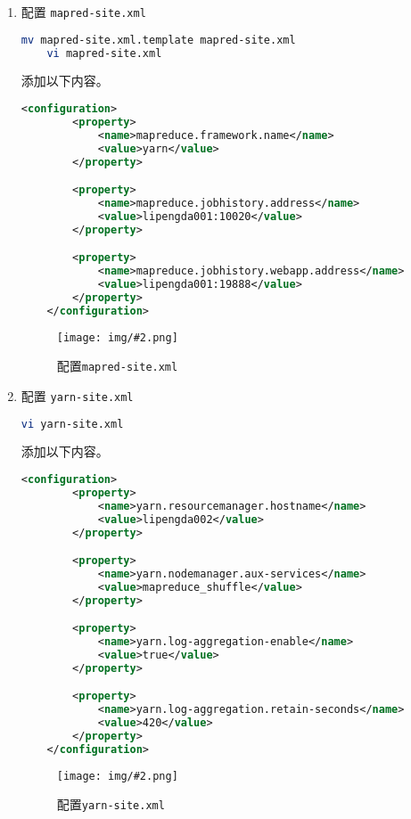 \documentclass{article}
\newenvironment{enum}{
    \begin{enumerate}[label=(\arabic*), noitemsep]
}{
    \end{enumerate}
}
\newcommand{\img}[3][0.9]{%
    \begin{figure}[H]
        \centering
        \texttt{[image: img/\#2.png]}
        \caption{#3}
    \end{figure}
}
\begin{document}
\begin{enum}
    \img{7.1.2.3}{配置\texttt{hdfs-site.xml}}

    \item 配置 \texttt{mapred-site.xml}
    
    \begin{lstlisting}[language=bash]
    mv mapred-site.xml.template mapred-site.xml
    vi mapred-site.xml
    \end{lstlisting}

    添加以下内容。

    \begin{lstlisting}[language=xml]
    <configuration>
        <property>
            <name>mapreduce.framework.name</name>
            <value>yarn</value>
        </property>

        <property>
            <name>mapreduce.jobhistory.address</name>
            <value>lipengda001:10020</value>
        </property>

        <property>
            <name>mapreduce.jobhistory.webapp.address</name>
            <value>lipengda001:19888</value>
        </property>
    </configuration>
    \end{lstlisting}

    \img{7.1.2.4}{配置\texttt{mapred-site.xml}}

    \item 配置 \texttt{yarn-site.xml}
    
    \begin{lstlisting}[language=bash]
    vi yarn-site.xml
    \end{lstlisting}

    添加以下内容。

    \begin{lstlisting}[language=xml]
    <configuration>
        <property>
            <name>yarn.resourcemanager.hostname</name>
            <value>lipengda002</value>
        </property>

        <property>
            <name>yarn.nodemanager.aux-services</name>
            <value>mapreduce_shuffle</value>
        </property>

        <property>
            <name>yarn.log-aggregation-enable</name>
            <value>true</value>
        </property>

        <property>
            <name>yarn.log-aggregation.retain-seconds</name>
            <value>420</value>
        </property>
    </configuration>
    \end{lstlisting}

    \img{7.1.2.5}{配置\texttt{yarn-site.xml}}


\end{enum}
\end{document}
